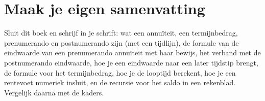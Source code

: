 
\ifzelfstudie
\section*{Maak je eigen samenvatting}
Sluit dit boek en schrijf in je schrift: wat een annuïteit, een termijnbedrag, prenumerando en postnumerando zijn (met een tijdlijn), de formule van de eindwaarde van een prenumerando annuïteit met haar bewijs, het verband met de postnumerando eindwaarde, hoe je een eindwaarde naar een later tijdstip brengt, de formule voor het termijnbedrag, hoe je de looptijd berekent, hoe je een rentevoet numeriek insluit, en de recursie voor het saldo in een rekenblad. Vergelijk daarna met de kaders.
\fi

